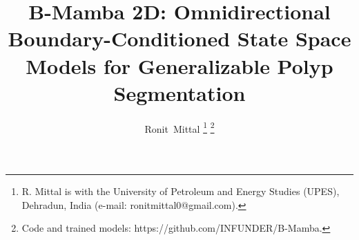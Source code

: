 \documentclass[journal]{IEEEtran}
\begin{document}

\title{B-Mamba 2D: Omnidirectional Boundary-Conditioned State Space Models for Generalizable Polyp Segmentation}

\author{Ronit~Mittal%
\thanks{R. Mittal is with the University of Petroleum and Energy Studies (UPES), Dehradun, India (e-mail: ronitmittal0@gmail.com).}%
\thanks{Code and trained models: https://github.com/INFUNDER/B-Mamba.}}


\maketitle

\end{document}
